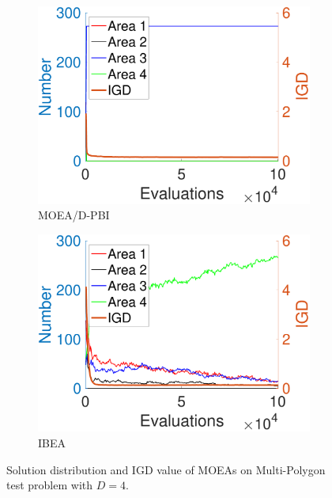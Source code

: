 \documentclass[conference]{IEEEtran}
\begin{document}
\begin{figure}[htbp]
\begin{subfigure}[b]{.24\textwidth}
    \end{subfigure}
    \begin{subfigure}[b]{.24\textwidth}
    \includegraphics[width=\linewidth]{Section5/dim4/Diversity/MOEAD_PBI}
    \caption{MOEA/D-PBI}
    \end{subfigure}
    \begin{subfigure}[b]{.24\textwidth}
    \includegraphics[width=\linewidth]{Section5/dim4/Diversity/IBEA}
    \caption{IBEA}
    \end{subfigure}

    \caption{Solution distribution and IGD value of MOEAs on Multi-Polygon test problem with $D=4$.}
    \label{fig: MOEAs Diversity dim=4}
\end{figure}
\end{document}
